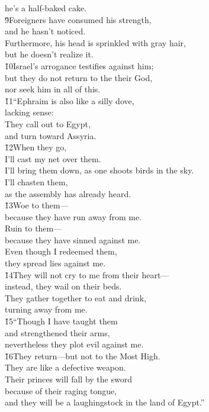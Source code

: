 \begin{poetry}
\poemll    he's a half-baked cake. \\
\poeml \v{9}Foreigners have consumed his strength, \\
\poemll    and he hasn't noticed. \\
\poeml Furthermore, his head is sprinkled with gray hair, \\
\poemll    but he doesn't realize it. \\
\poeml \v{10}Israel's arrogance testifies against him; \\
\poemll    but they do not return to the  their God, \\
\poemlll       nor seek him in all of this. \\
\poeml \v{11}``Ephraim is also like a silly dove, \\
\poemll    lacking sense: \\
\poeml They call out to Egypt, \\
\poemll    and turn toward Assyria. \\
\poeml \v{12}When they go, \\
\poemll    I'll cast my net over them. \\
\poeml I'll bring them down, as one shoots birds in the sky. \\
\poemll    I'll chasten them, \\
\poemlll       as the assembly has already heard. \\
\poeml \v{13}Woe to them--- \\
\poemll    because they have run away from me. \\
\poeml Ruin to them--- \\
\poemll    because they have sinned against me. \\
\poeml Even though I redeemed them, \\
\poemll    they spread lies against me. \\
\poeml \v{14}They will not cry to me from their heart--- \\
\poemll    instead, they wail on their beds. \\
\poeml They gather together to eat and drink, \\
\poemll    turning away from me. \\
\poeml \v{15}``Though I have taught them \\
\poemll    and strengthened their arms, \\
\poemlll       nevertheless they plot evil against me. \\
\poeml \v{16}They return---but not to the Most High. \\
\poemll    They are like a defective weapon. \\
\poeml Their princes will fall by the sword \\
\poemll    because of their raging tongue, \\
\poemlll       and they will be a laughingstock in the land of Egypt.''
\end{poetry}
